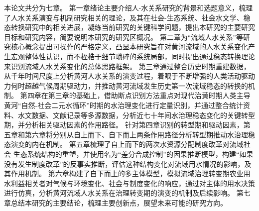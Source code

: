 本论文共分为七章。
第一章绪论主要介绍人-水关系研究的背景和选题意义，梳理了人水关系演变与机制研究相关的理论，及其在社会-生态系统、社会水文学、稳态转换研究中的相关进展，凝练当前研究的关键科学问题，提出本研究的主要研究目标和研究内容，简要说明本研究的研究区概况。
第二章为“流域人水关系”等研究核心概念提出可操作的严格定义，凸显本研究旨在对黄河流域的人水关系变化产生宏观整体性认识，而不桎梏于细节琐碎的系统局部，同时提出通过稳态转换理论来识别流域人水关系变化的总体思路框架。
第三章通过整合历史时期重建数据，从千年时间尺度上分析黄河人水关系的演变过程，着眼于不断增强的人类活动驱动力何时超越气候周期驱动力，并推动黄河流域发生历史第一次流域稳态的转换的机制。
第四章在第三章的基础上，借助断点识别方法重点对现代治黄时期人类主导黄河“自然-社会二元水循环”时期的水治理变化进行定量识别，并通过整合统计资料、水文数据、文献记录等多源数据，分析近七十年间水治理稳态变化的关键转型期，并分析相关驱动因素的作用路径。
针对第四章识别的转型期和驱动因素，第五章和第六章将分别从自上而下、自下而上两条作用路径分析转型期推动水治理稳态演变的内在机制。
第五章梳理了自上而下的两次水资源分配制度改革对流域社会-生态系统结构的重塑，并使用名为“差分合成控制”的因果推断模型，构建“如果没有发生制度改革”的反事实推断，评估这种结构变化对流域用水情况的影响，及其作用机制。
第六章构建了自下而上的多主体模型，模拟流域治理转变期农业用水利益相关者对气候与环境变化、社会与制度变化的响应，通过对主体的用水决策进行仿真，分析黄河流域人水关系在治理转变期的演变的机制及后续影响。
第七章总结本研究的主要结论，梳理主要创新点，展望未来可能的研究方向。